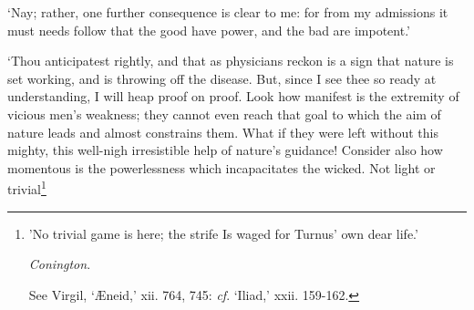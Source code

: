 \documentclass[12pt]{book}
\begin{document}
`Nay; rather, one further consequence is clear to me: for from my
admissions it must needs follow that the good have power, and the bad
are impotent.'

`Thou anticipatest rightly, and that as physicians reckon is a sign that
nature is set working, and is throwing off the disease. But, since I see
thee so ready at understanding, I will heap proof on proof. Look how
manifest is the extremity of vicious men's weakness; they cannot even
reach that goal to which the aim of nature leads and almost constrains
them. What if they were left without this mighty, this well-nigh
irresistible help of nature's guidance! Consider also how momentous is
the powerlessness which incapacitates the wicked. Not light or
trivial\footnote{'No trivial game is here; the strife Is waged for Turnus' own dear life.'

\emph{Conington}.

See Virgil, `Æneid,' xii. 764, 745: \emph{cf}. `Iliad,' xxii. 159-162.}
\end{document}
